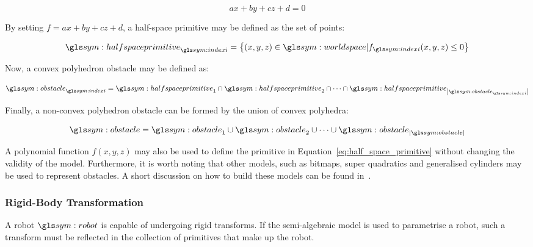 		\begin{equation}
			ax + by + cz + d = 0
		\end{equation}

		By setting
		\(
			f = ax + by +cz + d
		\),
		a half-space primitive may be defined as the set of points:

		\begin{equation}
			\halfspaceprimitive_{\indexi} =
				\left\{
					(x,y,z) \in \world |
					f_{\indexi}(x,y,z) \leq 0
				\right\}
				\label{eq:half_space_primitive}
		\end{equation}

		Now, a convex polyhedron obstacle may be
		defined as:

		\begin{equation}
			\obstacle_{\indexi} =
				\halfspaceprimitive_1 \cap \halfspaceprimitive_2 \cap \cdots \cap
				\halfspaceprimitive_{\cardinality{\obstacle_{\indexi}}}
				\label{eq:convex_obstacle}
		\end{equation}

		Finally, a non-convex polyhedron obstacle can be formed by the union of
		convex polyhedra:

		\begin{equation}
			\obstacle =
				\obstacle_1 \cup \obstacle_2 \cup \cdots \cup \obstacle_{\cardinality{\obstacle}}
				\label{eq:non_convex_obstacle}
		\end{equation}

		A polynomial function $f(x,y,z)$ may also be used to define the
		primitive in Equation~\ref{eq:half_space_primitive} without changing the
		validity of the model. Furthermore, it is worth noting that other
		models, such as bitmaps, super quadratics and generalised cylinders may
		be used to represent obstacles. A short discussion on how to build these
		models can be found in~\cite[][page
		89]{bib:planning:planning_algorithms}.

		\subsubsection{Rigid-Body Transformation}%
		\label{sec:rigid_body_transformation}

			A robot $\robot$ is capable of undergoing rigid transforms. If the
			semi-algebraic model is used to parametrise a robot, such a
			transform must be reflected in the collection of primitives that
			make up the robot.

